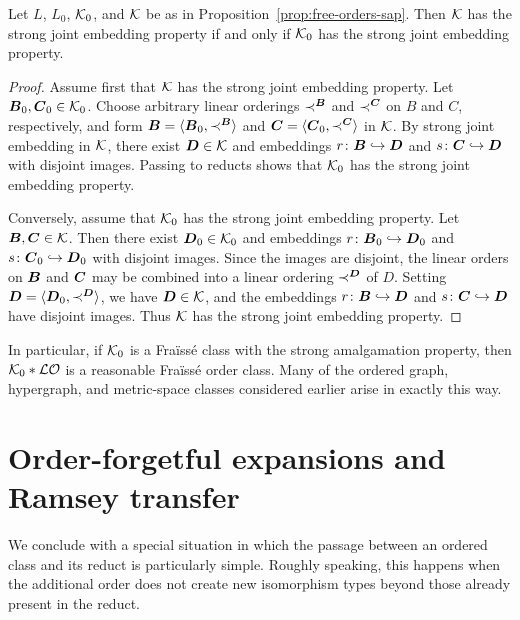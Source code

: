 \begin{corollary}
    \label{cor:free-orders-sjep}
    Let \(L\), \(L_0\), \(\mathcal{K}_0\), and \(\mathcal{K}\) be as in Proposition~\ref{prop:free-orders-sap}. Then \(\mathcal{K}\) has the strong joint embedding property if and only if \(\mathcal{K}_0\) has the strong joint embedding property.
\end{corollary}

\begin{proof}
    Assume first that \(\mathcal{K}\) has the strong joint embedding property. Let \(\boldsymbol{B}_0,\boldsymbol{C}_0\in\mathcal{K}_0\). Choose arbitrary linear orderings \(\prec^{\boldsymbol{B}}\) and \(\prec^{\boldsymbol{C}}\) on \(B\) and \(C\), respectively, and form \(\boldsymbol{B}=\langle \boldsymbol{B}_0,\prec^{\boldsymbol{B}}\rangle\) and \(\boldsymbol{C}=\langle \boldsymbol{C}_0,\prec^{\boldsymbol{C}}\rangle\) in \(\mathcal{K}\). By strong joint embedding in \(\mathcal{K}\), there exist \(\boldsymbol{D}\in\mathcal{K}\) and embeddings \(r\colon \boldsymbol{B}\hookrightarrow \boldsymbol{D}\) and \(s\colon \boldsymbol{C}\hookrightarrow \boldsymbol{D}\)
    with disjoint images. Passing to reducts shows that \(\mathcal{K}_0\) has the strong joint embedding property.

    Conversely, assume that \(\mathcal{K}_0\) has the strong joint embedding property. Let \(\boldsymbol{B},\boldsymbol{C}\in\mathcal{K}\). Then there exist \(\boldsymbol{D}_0\in\mathcal{K}_0\) and embeddings \(r\colon \boldsymbol{B}_0\hookrightarrow \boldsymbol{D}_0\) and \(s\colon \boldsymbol{C}_0\hookrightarrow \boldsymbol{D}_0\)
    with disjoint images. Since the images are disjoint, the linear orders on \(\boldsymbol{B}\) and \(\boldsymbol{C}\) may be combined into a linear ordering \(\prec^{\boldsymbol{D}}\) of \(D\). Setting \(\boldsymbol{D}=\langle \boldsymbol{D}_0,\prec^{\boldsymbol{D}}\rangle\), we have \(\boldsymbol{D}\in\mathcal{K}\), and the embeddings \(r\colon \boldsymbol{B}\hookrightarrow \boldsymbol{D}\) and \(s\colon \boldsymbol{C}\hookrightarrow \boldsymbol{D}\) have disjoint images. Thus \(\mathcal{K}\) has the strong joint embedding property.
\end{proof}
In particular, if \(\mathcal{K}_0\) is a Fraïssé class with the strong amalgamation property, then \(\mathcal{K}_0 * \mathcal{LO}\) is a reasonable Fraïssé order class. Many of the ordered graph, hypergraph, and metric-space classes considered earlier arise in exactly this way.

\section{Order-forgetful expansions and Ramsey transfer}

We conclude with a special situation in which the passage between an ordered class and its reduct is particularly simple. Roughly speaking, this happens when the additional order does not create new isomorphism types beyond those already present in the reduct.

